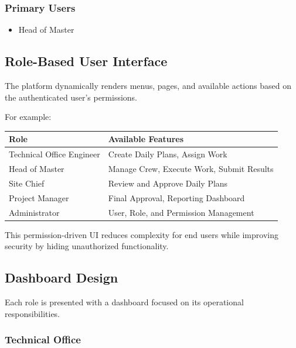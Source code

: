 \documentclass[11pt]{article}
\begin{document}
\subsubsection*{Primary Users}

\begin{itemize}
    \item Head of Master
\end{itemize}

\subsection{Role-Based User Interface}

The platform dynamically renders menus, pages, and available actions based on
the authenticated user's permissions.

For example:

\renewcommand{\arraystretch}{1.15}
\begin{tabularx}{\textwidth}{|>{\raggedright\arraybackslash}p{}|>{\raggedright\arraybackslash}X|}
    \hline
    \textbf{Role} & \textbf{Available Features} \\
    \hline
    Technical Office Engineer & Create Daily Plans, Assign Work \\
    \hline
    Head of Master & Manage Crew, Execute Work, Submit Results \\
    \hline
    Site Chief & Review and Approve Daily Plans \\
    \hline
    Project Manager & Final Approval, Reporting Dashboard \\
    \hline
    Administrator & User, Role, and Permission Management \\
    \hline
\end{tabularx}
\renewcommand{\arraystretch}{1}

This permission-driven UI reduces complexity for end users while improving
security by hiding unauthorized functionality.

\subsection{Dashboard Design}

Each role is presented with a dashboard focused on its operational
responsibilities.

\subsubsection*{Technical Office}
\end{document}
